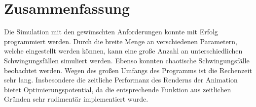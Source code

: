 \chapter{Zusammenfassung}
    Die Simulation mit den gewünschten Anforderungen konnte mit Erfolg programmiert werden.
    Durch die breite Menge an verschiedenen Parametern, welche eingestellt werden können, kann eine große Anzahl an unterschiedlichen Schwingungsfällen simuliert werden.
    Ebenso konnten chaotische Schwingungsfälle beobachtet werden.
    Wegen des großen Umfangs des Programms ist die Rechenzeit sehr lang.
    Insbesondere die zeitliche Performanz des Renderns der Animation bietet Optimierungspotential, da die entsprechende Funktion aus zeitlichen Gründen sehr rudimentär implementiert wurde.
    

